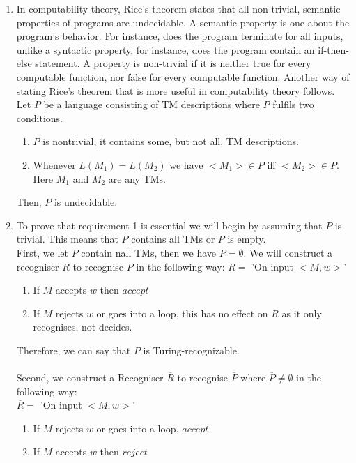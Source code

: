 \documentclass[a4paper,12pt]{article}
\begin{document}
\begin{enumerate}
\item In computability theory, Rice's theorem states that all non-trivial, semantic properties of programs are undecidable. A semantic property is one about the program's behavior. For instance, does the program terminate for all inputs, unlike a syntactic property, for instance, does the program contain an if-then-else statement. A property is non-trivial if it is neither true for every computable function, nor false for every computable function. Another way of stating Rice's theorem that is more useful in computability theory follows. \\
Let $P$ be a language consisting of TM descriptions where $P$ fulfils two conditions. \begin{enumerate}[label=\arabic*)]
\item $P$ is nontrivial, it contains some, but not all, TM descriptions.
\item Whenever $L(M_1) = L(M_2)$ we have $<M_1> \in P$ iff $<M_2> \in P$. Here $M_1$ and $M_2$ are any TMs.
\end{enumerate}
Then, $P$ is undecidable.
\item To prove that requirement 1 is essential we will begin by assuming that $P$ is trivial. This means that $P$ contains all TMs or $P$ is empty. \\
First, we let $P$ contain nall TMs, then we have $P= \emptyset$. We will construct a recogniser $R$ to recognise $P$ in the following way:
$R =$ 'On input $<M, w>$'
\begin{enumerate}[label=\arabic*)]
\item If $M$ accepts $w$ then $accept$
\item If $M$ rejects $w$ or goes into a loop, this has no effect on $R$ as it only recognises, not decides. 
\end{enumerate}
Therefore, we can say that $P$ is Turing-recognizable. \\
\\
Second, we construct a Recogniser $\overline{R}$ to recognise $\overline{P}$ where $\overline{P} \neq \emptyset$ in the following way: \\
$\overline{R} =$ 'On input $<M, w>$'
\begin{enumerate}[label=\arabic*)]
\item If $M$ rejects $w$ or goes into a loop, $accept$
\item If $M$ accepts $w$ then $reject$
\end{enumerate}

\end{enumerate}
\end{document}
